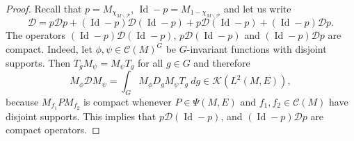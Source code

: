 \documentclass[10pt,a4paper]{amsart}
\newcommand{\maC}{\mathcal C}
\newcommand{\maD}{\mathcal D}
\newcommand{\maK}{\mathcal K}
\newcommand{\maP}{\mathcal P}
\newcommand{\oid}{\operatorname{Id}}
\begin{document}
\begin{proof}
%

Recall that $p=M_{\chi_{M\smallsetminus \maP}}$, $\oid-p = M_{1-\chi_{M\smallsetminus \maP}}$ and 
let us write 
\begin{equation*}
\maD= p \maD p + (\oid-p) \maD (\oid-p) +p \maD (\oid-p) + (\oid - p) \maD p.
\end{equation*}
The operators $(\oid-p) \maD (\oid-p)$, $p \maD (\oid-p)$ and $(\oid - p) \maD p$ are compact.
Indeed, let 
$\phi,\psi \in \maC(M)^G$ be $G$-invariant functions with disjoint supports. 
Then  $T_g M_\psi=M_\psi T_g$ for all $g\in G$ and therefore
\begin{equation*}
M_\phi \maD M_\psi 
= \int_G M_\phi D_g  M_\psi  T_g \ dg \in \maK(L^2(M,E)), 
\end{equation*}
because $M_{f_1} P M_{f_2}$ is compact whenever $ P \in \Psi(M,E)$ and $f_1,f_2 \in \maC(M)$ have disjoint supports.
This implies that $p \maD (\oid-p)$, and $ (\oid-p) \maD p$ are compact operators.


\end{proof}
\end{document}
